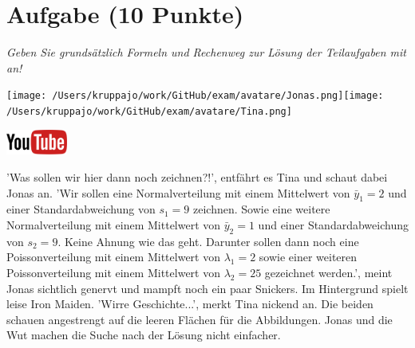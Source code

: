 \documentclass[a4paper, 9pt]{scrartcl}\usepackage[]{graphicx}\usepackage[]{xcolor}
\begin{document}
 
\clearpage

\section{Aufgabe \hfill (10 Punkte)}

\textit{Geben Sie grundsätzlich Formeln und Rechenweg zur Lösung der Teilaufgaben mit an!} \\[1Ex]
 

 
\begin{minipage}[t]{0.5\textwidth}
\texttt{[image: /Users/kruppajo/work/GitHub/exam/avatare/Jonas.png]}\hspace{-4mm}\texttt{[image: /Users/kruppajo/work/GitHub/exam/avatare/Tina.png]}
\end{minipage}
\begin{minipage}[t]{0.5\textwidth}
\hfill
\href{https://youtu.be/MiD42k4l5Ag}{\includegraphics[width = 2cm]{img/youtube}}
\end{minipage}
\vspace{1ex}



'Was sollen wir hier dann noch zeichnen?!', entfährt es Tina und schaut dabei Jonas an. 'Wir sollen eine Normalverteilung mit einem Mittelwert von $\bar{y}_1 = 2$ und einer Standardabweichung von $s_1 = 9$ zeichnen. Sowie eine weitere Normalverteilung mit einem Mittelwert von $\bar{y}_2 = 1$ und einer Standardabweichung von $s_2 = 9$. Keine Ahnung wie das geht. Darunter sollen dann noch eine Poissonverteilung mit einem Mittelwert von $\lambda_1 = 2$ sowie einer weiteren Poissonverteilung mit einem Mittelwert von $\lambda_2 = 25$ gezeichnet werden.', meint Jonas sichtlich genervt und mampft noch ein paar Snickers. Im Hintergrund spielt leise Iron Maiden. 'Wirre Geschichte...', merkt Tina nickend an. Die beiden schauen angestrengt auf die leeren Flächen für die Abbildungen. Jonas und die Wut machen die Suche nach der Lösung nicht einfacher.\\
\end{document}
